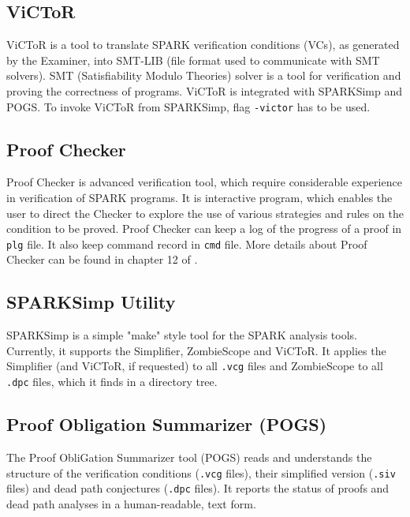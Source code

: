 \subsection{ViCToR}
\label{background:sparkverification:victor}

ViCToR is a tool to translate SPARK verification conditions (VCs), as generated by the Examiner, into SMT-LIB (file format used to communicate with SMT solvers). \cite{Victor:Online} SMT (Satisfiability Modulo Theories) solver is a tool for verification and proving the correctness of programs. ViCToR is integrated with SPARKSimp and POGS. To invoke ViCToR from SPARKSimp, flag \lstinline{-victor} has to be used.



\subsection{Proof Checker}
\label{background:sparkverification:proofchecker}

Proof Checker is advanced verification tool, which require considerable experience in verification of SPARK programs. It is interactive program, which enables the user to direct the Checker to explore the use of various strategies and rules on the condition to be proved. Proof Checker can keep a log of the progress of a proof in \lstinline{plg} file. It also keep command record in \lstinline{cmd} file. More details about Proof Checker can be found in chapter 12 of \cite{Barnes:Book}.



\subsection{SPARKSimp Utility}
\label{background:sparkverification:sparksimp}
SPARKSimp is a simple "make" style tool for the SPARK analysis tools. Currently, it supports the Simplifier, ZombieScope and ViCToR. It applies the Simplifier (and ViCToR, if requested) to all \lstinline{.vcg} files and ZombieScope to all \lstinline{.dpc} files, which it finds in a directory tree. \cite{SPARKSimp:Online} 



\subsection{Proof Obligation Summarizer (POGS)}
\label{background:sparkverification:pogs}

The Proof ObliGation Summarizer tool (POGS) reads and understands the structure of the verification conditions (\lstinline{.vcg} files), their simplified version (\lstinline{.siv} files) and dead path conjectures (\lstinline{.dpc} files). It reports the status of proofs and dead path analyses in a human-readable, text form. \cite{POGS:Online} 



